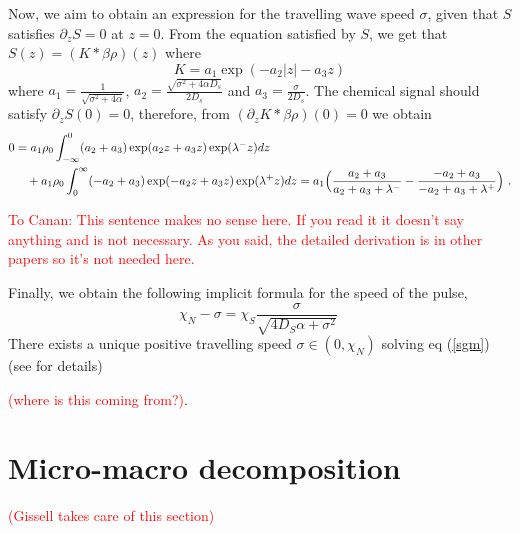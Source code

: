 \documentclass[11pt,twoside]{article}
\numberwithin{equation}{section}
\begin{document}
Now, we aim to obtain an expression for the travelling wave speed $\sigma$, given that $S$ satisfies $\partial_zS=0$ at $z=0$. 
From the equation satisfied by $S$, we get that $S(z)=(K*\beta\rho)(z)$ where 
\begin{displaymath}
    K=a_1\exp\left(-a_2|z|-a_3z\right)
\end{displaymath}
where $a_1=\frac{1}{\sqrt{\sigma^2+4\alpha}}$,   $a_2=\frac{\sqrt{\sigma^2+4\alpha D_s}}{2D_s}$ and $a_3=\frac{\sigma}{2D_s}$.
The chemical signal should satisfy $\partial_zS(0)=0$, therefore, from $(\partial_z K *\beta\rho)(0)=0$ we obtain
\begin{align*}
    0&=a_1\rho_0\int_{-\infty}^{0}(a_2+a_3) \exp(a_2z+a_3z)\exp(\lambda^-z)dz\\ &\quad+a_1\rho_0\int_{0}^{\infty}(-a_2+a_3)\exp(-a_2z+a_3z)\exp(\lambda^{+}z)dz
    =a_1\Bigl(\frac{a_2+a_3}{a_2+a_3+\lambda^{-}}-\frac{-a_2+a_3}{-a_2+a_3+\lambda^+}\Bigr)\ .
\end{align*}

\textcolor{red}{To Canan: This sentence makes no sense here. If you read it it doesn't say anything and is not necessary. As you said, the detailed derivation is in other papers so it's not needed here.}

Finally, we obtain the following implicit formula for the speed of the pulse,
\begin{equation}\label{sgm}
\chi_N-\sigma=\chi_S\dfrac{\sigma}{\sqrt{4D_S\alpha+\sigma^2}}\ \end{equation}
There exists a unique positive travelling speed $\sigma\in (0,\chi_N)$  solving eq (\ref{sgm}) (see \cite{saragosti2010mathematical} for details)

\textcolor{red}{(where is this coming from?)}.




\section{Micro-macro decomposition}
\textcolor{red}{(Gissell takes care of this section)}
\end{document}
